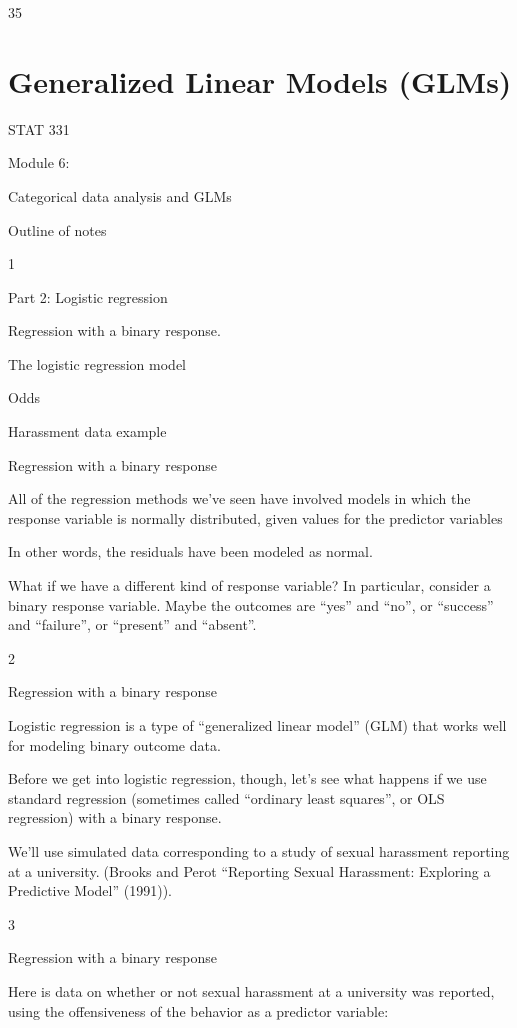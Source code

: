 \documentclass[
  letterpaper,
  DIV=11,
  numbers=noendperiod]{scrreprt}
\begin{document}
35


\hypertarget{generalized-linear-models-glms}{%
\chapter{Generalized Linear Models
(GLMs)}\label{generalized-linear-models-glms}}

STAT 331

Module 6:

Categorical data analysis and GLMs

Outline of notes

1

Part 2: Logistic regression

Regression with a binary response.

The logistic regression model

Odds

Harassment data example

Regression with a binary response

All of the regression methods we've seen have involved models in which
the response variable is normally distributed, given values for the
predictor variables

In other words, the residuals have been modeled as normal.

What if we have a different kind of response variable? In particular,
consider a binary response variable. Maybe the outcomes are ``yes'' and
``no'', or ``success'' and ``failure'', or ``present'' and ``absent''.

2

Regression with a binary response

Logistic regression is a type of ``generalized linear model'' (GLM) that
works well for modeling binary outcome data.

Before we get into logistic regression, though, let's see what happens
if we use standard regression (sometimes called ``ordinary least
squares'', or OLS regression) with a binary response.

We'll use simulated data corresponding to a study of sexual harassment
reporting at a university.(Brooks and Perot ``Reporting Sexual
Harassment: Exploring a Predictive Model'' (1991)).

3

Regression with a binary response

Here is data on whether or not sexual harassment at a university was
reported, using the offensiveness of the behavior as a predictor
variable:
\end{document}
